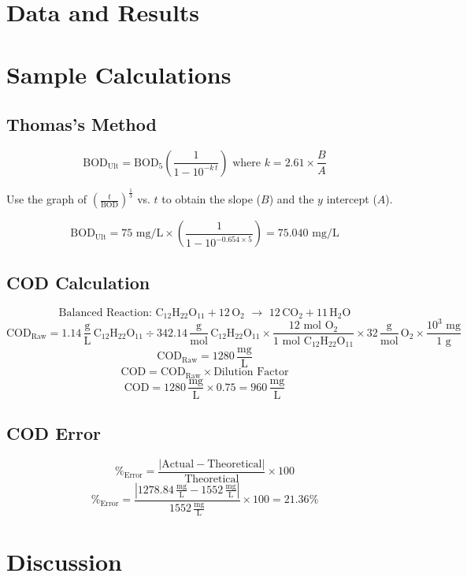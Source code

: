 \documentclass{article}
\begin{document}
    \section{Data and Results}
    
    \newpage
    \section{Sample Calculations}
    \subsection{Thomas's Method}
    \[\text{BOD}_\text{Ult}=\text{BOD}_5\left(\frac{1}{1-10^{-k\,t}}\right)\text{ where }k=2.61\times\frac{B}{A}\]
    \begin{center}
        Use the graph of \(\left(\frac{t}{\text{BOD}}\right)^\frac{1}{3}\) vs. \(t\) to obtain the slope (\(B\)) and the \(y\) intercept (\(A\)).
    \end{center}
    \[\text{BOD}_\text{Ult}=75\text{ mg/L}\times\left(\frac{1}{1-10^{-0.654\times5}}\right)=\boxed{75.040\text{ mg/L}}\]
    \subsection{COD Calculation}
    \[\text{Balanced Reaction: }\text{C}_{12}\text{H}_{22}\text{O}_{11}+12\,\text{O}_2\,\,\rightarrow\,\,12\,\text{CO}_2+11\,\text{H}_2\text{O}\]
    \[\text{COD}_\text{Raw}=1.14\,\frac{\text{g}}{\text{L}}\,\text{C}_{12}\text{H}_{22}\text{O}_{11}\div342.14\,\frac{\text{g}}{\text{mol}}\,\text{C}_{12}\text{H}_{22}\text{O}_{11}\times\frac{12 \text{ mol O}_2}{1 \text{ mol} \text{ C}_{12}\text{H}_{22}\text{O}_{11}}\times32\,\frac{\text{g}}{\text{mol}}\,\text{O}_2\times\frac{10^3 \text{ mg}}{1 \text{ g}}\]
    \[\text{COD}_\text{Raw}=1280\,\frac{\text{mg}}{\text{L}}\]
    \[\text{COD}=\text{COD}_\text{Raw}\times\text{Dilution Factor}\]
    \[\text{COD}=1280\,\frac{\text{mg}}{\text{L}}\times0.75=\boxed{960\,\frac{\text{mg}}{\text{L}}}\]
    \subsection{COD Error}
    \[\%_\text{Error}=\frac{|\text{Actual}-\text{Theoretical}|}{\text{Theoretical}}\times 100\]
    \[\%_\text{Error}=\frac{|1278.84\,\frac{\text{mg}}{\text{L}}-1552\,\frac{\text{mg}}{\text{L}}|}{1552\,\frac{\text{mg}}{\text{L}}}\times 100=\boxed{21.36\%}\]
    \newpage
    \section{Discussion}
\end{document}
